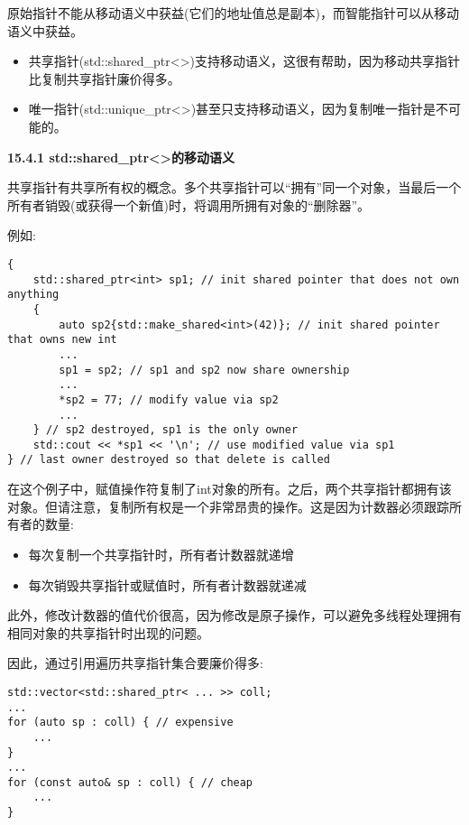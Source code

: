 原始指针不能从移动语义中获益(它们的地址值总是副本)，而智能指针可以从移动语义中获益。\par

\begin{itemize}
	\item 共享指针(std::shared\_ptr<>)支持移动语义，这很有帮助，因为移动共享指针比复制共享指针廉价得多。
	\item 唯一指针(std::unique\_ptr<>)甚至只支持移动语义，因为复制唯一指针是不可能的。
\end{itemize}

\hspace*{\fill} \par %
\textbf{15.4.1 std::shared\_ptr<>的移动语义}

共享指针有共享所有权的概念。多个共享指针可以“拥有”同一个对象，当最后一个所有者销毁(或获得一个新值)时，将调用所拥有对象的“删除器”。\par

例如:\par

\begin{lstlisting}[caption={}]
{
	std::shared_ptr<int> sp1; // init shared pointer that does not own anything
	{
		auto sp2{std::make_shared<int>(42)}; // init shared pointer that owns new int
		...
		sp1 = sp2; // sp1 and sp2 now share ownership
		...
		*sp2 = 77; // modify value via sp2
		...
	} // sp2 destroyed, sp1 is the only owner
	std::cout << *sp1 << '\n'; // use modified value via sp1
} // last owner destroyed so that delete is called
\end{lstlisting}

在这个例子中，赋值操作符复制了int对象的所有。之后，两个共享指针都拥有该对象。但请注意，复制所有权是一个非常昂贵的操作。这是因为计数器必须跟踪所有者的数量:\par

\begin{itemize}
	\item 每次复制一个共享指针时，所有者计数器就递增
	\item 每次销毁共享指针或赋值时，所有者计数器就递减
\end{itemize}

此外，修改计数器的值代价很高，因为修改是原子操作，可以避免多线程处理拥有相同对象的共享指针时出现的问题。\par

因此，通过引用遍历共享指针集合要廉价得多:\par

\begin{lstlisting}[caption={}]
std::vector<std::shared_ptr< ... >> coll;
...
for (auto sp : coll) { // expensive
	...
}
...
for (const auto& sp : coll) { // cheap
	...
}
\end{lstlisting}

